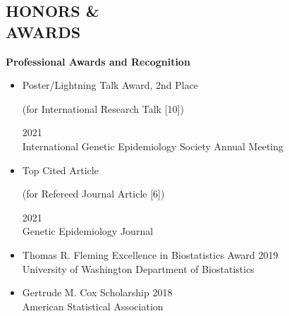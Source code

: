 \documentclass[margin]{res}
\begin{document}
\begin{resume}
\section{HONORS \& \\ AWARDS}

\textbf{Professional Awards and Recognition}
\begin{itemize}
\item Poster/Lightning Talk Award, 2nd Place  \begin{footnotesize}(for International Research Talk [10])\end{footnotesize} \hfill 2021 \\
International Genetic Epidemiology Society Annual Meeting
\item Top Cited Article \begin{footnotesize}(for Refereed Journal Article [6])\end{footnotesize}  \hfill 2021 \\
Genetic Epidemiology Journal
\item Thomas R. Fleming Excellence in Biostatistics Award \hfill 2019 \\   
University of Washington Department of Biostatistics
\item Gertrude M. Cox Scholarship \hfill 2018 \\ American Statistical Association

\end{itemize}
\end{resume}
\end{document}
